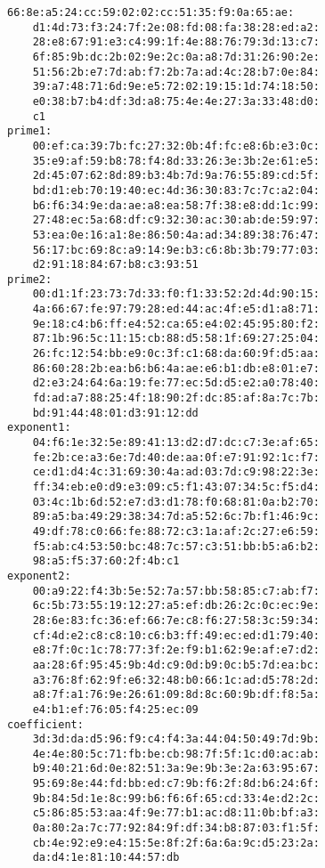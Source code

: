 \begin{ex}
{\begin{Verbatim}[frame=single]
    66:8e:a5:24:cc:59:02:02:cc:51:35:f9:0a:65:ae:
    d1:4d:73:f3:24:7f:2e:08:fd:08:fa:38:28:ed:a2:
    28:e8:67:91:e3:c4:99:1f:4e:88:76:79:3d:13:c7:
    6f:85:9b:dc:2b:02:9e:2c:0a:a8:7d:31:26:90:2e:
    51:56:2b:e7:7d:ab:f7:2b:7a:ad:4c:28:b7:0e:84:
    39:a7:48:71:6d:9e:e5:72:02:19:15:1d:74:18:50:
    e0:38:b7:b4:df:3d:a8:75:4e:4e:27:3a:33:48:d0:
    c1
prime1:
    00:ef:ca:39:7b:fc:27:32:0b:4f:fc:e8:6b:e3:0c:
    35:e9:af:59:b8:78:f4:8d:33:26:3e:3b:2e:61:e5:
    2d:45:07:62:8d:89:b3:4b:7d:9a:76:55:89:cd:5f:
    bd:d1:eb:70:19:40:ec:4d:36:30:83:7c:7c:a2:04:
    b6:f6:34:9e:da:ae:a8:ea:58:7f:38:e8:dd:1c:99:
    27:48:ec:5a:68:df:c9:32:30:ac:30:ab:de:59:97:
    53:ea:0e:16:a1:8e:86:50:4a:ad:34:89:38:76:47:
    56:17:bc:69:8c:a9:14:9e:b3:c6:8b:3b:79:77:03:
    d2:91:18:84:67:b8:c3:93:51
prime2:
    00:d1:1f:23:73:7d:33:f0:f1:33:52:2d:4d:90:15:
    4a:66:67:fe:97:79:28:ed:44:ac:4f:e5:d1:a8:71:
    9e:18:c4:b6:ff:e4:52:ca:65:e4:02:45:95:80:f2:
    87:1b:96:5c:11:15:cb:88:d5:58:1f:69:27:25:04:
    26:fc:12:54:bb:e9:0c:3f:c1:68:da:60:9f:d5:aa:
    86:60:28:2b:ea:b6:b6:4a:ae:e6:b1:db:e8:01:e7:
    d2:e3:24:64:6a:19:fe:77:ec:5d:d5:e2:a0:78:40:
    fd:ad:a7:88:25:4f:18:90:2f:dc:85:af:8a:7c:7b:
    bd:91:44:48:01:d3:91:12:dd
exponent1:
    04:f6:1e:32:5e:89:41:13:d2:d7:dc:c7:3e:af:65:
    fe:2b:ce:a3:6e:7d:40:de:aa:0f:e7:91:92:1c:f7:
    ce:d1:d4:4c:31:69:30:4a:ad:03:7d:c9:98:22:3e:
    ff:34:eb:e0:d9:e3:09:c5:f1:43:07:34:5c:f5:d4:
    03:4c:1b:6d:52:e7:d3:d1:78:f0:68:81:0a:b2:70:
    89:a5:ba:49:29:38:34:7d:a5:52:6c:7b:f1:46:9c:
    49:df:78:c0:66:fe:88:72:c3:1a:af:2c:27:e6:59:
    f5:ab:c4:53:50:bc:48:7c:57:c3:51:bb:b5:a6:b2:
    98:a5:f5:37:60:2f:4b:c1
exponent2:
    00:a9:22:f4:3b:5e:52:7a:57:bb:58:85:c7:ab:f7:
    6c:5b:73:55:19:12:27:a5:ef:db:26:2c:0c:ec:9e:
    28:6e:83:fc:36:ef:66:7e:c8:f6:27:58:3c:59:34:
    cf:4d:e2:c8:c8:10:c6:b3:ff:49:ec:ed:d1:79:40:
    e8:7f:0c:1c:78:77:3f:2e:f9:b1:62:9e:af:e7:d2:
    aa:28:6f:95:45:9b:4d:c9:0d:b9:0c:b5:7d:ea:bc:
    a3:76:8f:62:9f:e6:32:48:b0:66:1c:ad:d5:78:2d:
    a8:7f:a1:76:9e:26:61:09:8d:8c:60:9b:df:f8:5a:
    e4:b1:ef:76:05:f4:25:ec:09
coefficient:
    3d:3d:da:d5:96:f9:c4:f4:3a:44:04:50:49:7d:9b:
    4e:4e:80:5c:71:fb:be:cb:98:7f:5f:1c:d0:ac:ab:
    b9:40:21:6d:0e:82:51:3a:9e:9b:3e:2a:63:95:67:
    95:69:8e:44:fd:bb:ed:c7:9b:f6:2f:8d:b6:24:6f:
    9b:84:5d:1e:8c:99:b6:f6:6f:65:cd:33:4e:d2:2c:
    c5:86:85:53:aa:4f:9e:77:b1:ac:d8:11:0b:bf:a3:
    0a:80:2a:7c:77:92:84:9f:df:34:b8:87:03:f1:5f:
    cb:4e:92:e9:e4:15:5e:8f:2f:6a:6a:9c:d5:23:2a:
    da:d4:1e:81:10:44:57:db
\end{Verbatim}
}
\end{ex}
